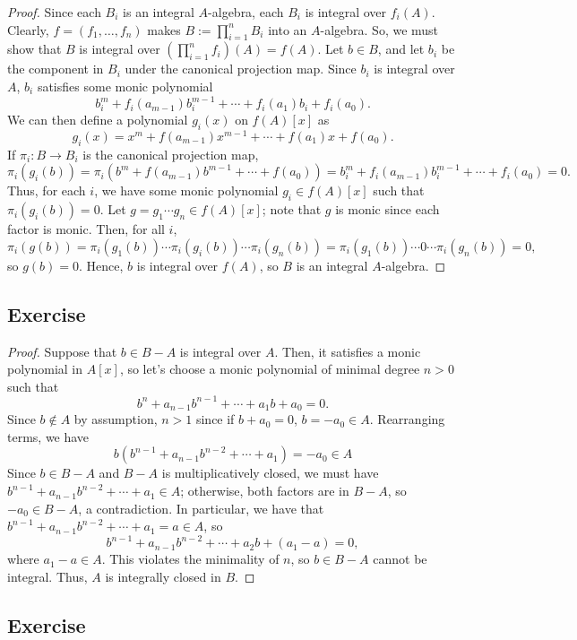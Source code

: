 \begin{proof}
Since each $B_i$ is an integral $A$-algebra, each $B_i$ is integral over $f_i(A)$. Clearly, $f = (f_1,\ldots,f_n)$ makes $B := \prod_{i=1}^n B_i$ into
an $A$-algebra. So, we must show that $B$ is integral over $(\prod_{i=1}^n f_i)(A) = f(A)$. Let $b \in B$, and let $b_i$ be the component in $B_i$ under the
canonical projection map. Since $b_i$ is integral over $A$, $b_i$ satisfies some monic polynomial
$$b_i^m + f_i(a_{m-1})b_i^{m-1} + \cdots + f_i(a_1)b_i + f_i(a_0).$$
We can then define a polynomial $g_i(x)$ on $f(A)[x]$ as
$$g_i(x) = x^m + f(a_{m-1})x^{m-1} + \cdots + f(a_1)x + f(a_0).$$
If $\pi_i : B \to B_i$ is the canonical projection map,
$$\pi_i(g_i(b)) = \pi_i(b^m + f(a_{m-1})b^{m-1} + \cdots + f(a_0)) = b_i^m + f_i(a_{m-1})b_i^{m-1} + \cdots + f_i(a_0) = 0.$$
Thus, for each $i$, we have some monic polynomial $g_i \in f(A)[x]$ such that $\pi_i(g_i(b)) = 0$. Let $g = g_1 \cdots g_n \in f(A)[x]$; note that $g$
is monic since each factor is monic. Then, for all $i$,
$$\pi_i(g(b)) = \pi_i(g_1(b)) \cdots \pi_i(g_i(b)) \cdots \pi_i(g_n(b)) = \pi_i(g_1(b)) \cdots 0 \cdots \pi_i(g_n(b)) = 0,$$
so $g(b) = 0$. Hence, $b$ is integral over $f(A)$, so $B$ is an integral $A$-algebra.
\end{proof}

\subsection{Exercise}\label{5.7}

\begin{proof}
Suppose that $b \in B-A$ is integral over $A$. Then, it satisfies a monic polynomial in $A[x]$, so let's choose a monic polynomial of minimal degree $n > 0$
such that
$$b^n + a_{n-1}b^{n-1} + \cdots + a_1 b + a_0 = 0.$$
Since $b \not\in A$ by assumption, $n > 1$ since if $b + a_0 = 0$, $b = -a_0 \in A$. Rearranging terms, we have
$$b(b^{n-1} + a_{n-1}b^{n-2} + \cdots + a_1) = - a_0 \in A$$
Since $b \in B - A$ and $B - A$ is multiplicatively closed, we must have $b^{n-1} + a_{n-1}b^{n-2} + \cdots + a_1 \in A$; otherwise, both factors are in
$B-A$, so $-a_0 \in B-A$, a contradiction. In particular, we have that $b^{n-1} + a_{n-1}b^{n-2} + \cdots + a_1 = a \in A$, so
$$b^{n-1} + a_{n-1}b^{n-2} + \cdots + a_2 b + (a_1 - a) = 0,$$
where $a_1 - a \in A$. This violates the minimality of $n$, so $b \in B-A$ cannot be integral. Thus, $A$ is integrally closed in $B$.
\end{proof}

\subsection{Exercise}\label{5.8}

